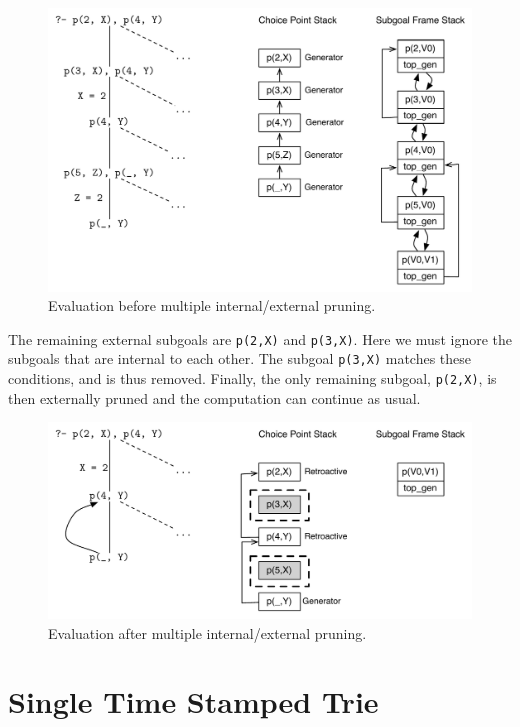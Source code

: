 \begin{figure}[ht]
  \centering
    \includegraphics[scale=0.6]{retro_mix_multiple_before.pdf}
  \caption{Evaluation before multiple internal/external pruning.}
  \label{fig:retro_mix_multiple_before}
\end{figure}

The remaining external subgoals are \texttt{p(2,X)} and \texttt{p(3,X)}. Here we must ignore the subgoals
that are internal to each other. The subgoal \texttt{p(3,X)} matches these conditions, and is thus
removed. Finally, the only remaining subgoal, \texttt{p(2,X)}, is then externally pruned and the computation
can continue as usual.

\begin{figure}[ht]
  \centering
    \includegraphics[scale=0.6]{retro_mix_multiple_after.pdf}
  \caption{Evaluation after multiple internal/external pruning.}
  \label{fig:retro_mix_multiple_after}
\end{figure}

\section{Single Time Stamped Trie}

